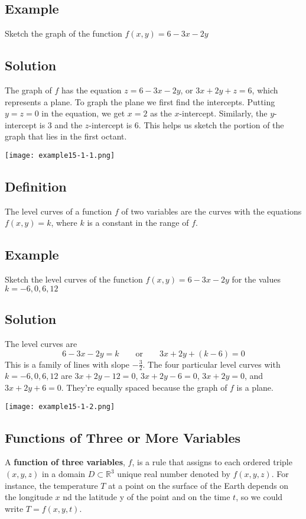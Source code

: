 \subsection*{Example}
Sketch the graph of the function $f(x, y) = 6 - 3x - 2y$

\subsection*{Solution}
The graph of $f$ has the equation $z = 6 - 3x - 2y$, or $3x + 2y + z = 6$, which represents
a plane. To graph the plane we first find the intercepts. Putting $y = z = 0$ in the
equation, we get $x = 2$ as the $x$-intercept. Similarly, the $y$-intercept is 3 and the
$z$-intercept is 6. This helps us sketch the portion of the graph that lies in the
first octant.
\begin{center}
    \texttt{[image: example15-1-1.png]}
\end{center}

\subsection*{Definition}
The level curves of a function $f$ of two variables are the curves with the equations
$f(x,y)=k$, where $k$ is a constant in the range of $f$.

\subsection*{Example}
Sketch the level curves of the function $f(x,y)=6-3x-2y$ for the values $k=-6,0,6,12$

\subsection*{Solution}
The level curves are
$$6-3x-2y=k \qquad \text{or} \qquad 3x+2y+(k-6)=0$$
This is a family of lines with slope $-\frac{3}{2}$. The four particular level curves
with $k=-6,0,6,12$ are $3x+2y-12=0$, $3x+2y-6=0$, $3x+2y=0$, and $3x+2y+6=0$. They're
equally spaced because the graph of $f$ is a plane.
\begin{center}
    \texttt{[image: example15-1-2.png]}
\end{center}

\subsection*{Functions of Three or More Variables}
A \textbf{function of three variables}, $f$, is a rule that assigns to each ordered triple
$(x, y, z)$ in a domain $D\subset\mathbb{R}^3$ unique real number denoted by $f(x, y, z)$. For instance,
the temperature $T$ at a point on the surface of the Earth depends on the longitude $x$
nd the latitude y of the point and on the time $t$, so we could write $T = f(x, y, t)$.

